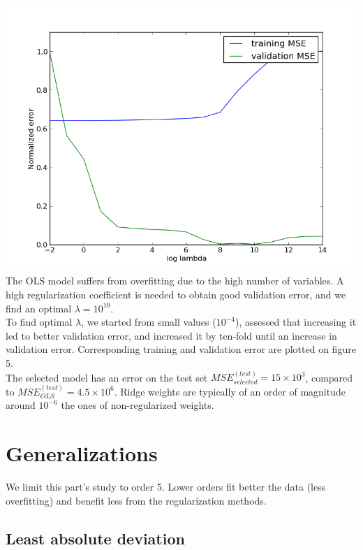 \documentclass[twoside]{article}
\begin{document}
\begingroup
\centering
\includegraphics[scale=0.30]{./img/lambda_error.png}
\endgroup
\vspace{0.2 in}
The OLS model suffers from overfitting due to the high number of variables. A high regularization coefficient is needed to obtain good validation error, and we find an optimal $\lambda=10^{10}$.\\
To find optimal $\lambda$, we started from small values ($10^{-4}$), assessed that increasing it led to better validation error, and increased it by ten-fold until an increase in validation error. Corresponding training and validation error are plotted on figure 5.\\
The selected model has an error on the test set $MSE_{selected}^{(test)} = 15 \times 10^{3}$, compared to $MSE_{OLS}^{(test)} = 4.5 \times 10^{6}$. Ridge weights are typically of an order of magnitude around $10^{-6}$ the ones of non-regularized weights.



\section{Generalizations}

We limit this part's study to order 5. Lower orders fit better the data (less overfitting) and benefit less from the regularization methods.

\subsection{Least absolute deviation}
\end{document}
